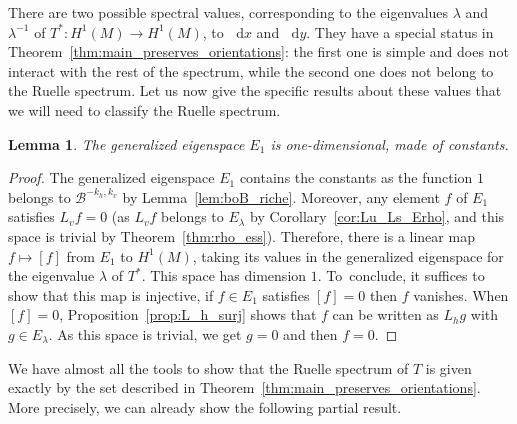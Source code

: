 \documentclass[JEP,XML,SOM,Unicode]{cedram}
\newcommand{\boB}{\mathcal{B}}
\newcommand{\dd}{\mathop{}\!\mathrm{d}}
\newtheorem{lem}[thm]{Lemma}
\theoremstyle{definition}
\numberwithin{equation}{section}
\begin{document}
There are two possible spectral values, corresponding to the eigenvalues
$\lambda$ and~$\lambda^{-1}$ of $T^*: H^1(M) \to H^1(M)$, \ie to $\dd x$
and $\dd y$. They have a special status in
Theorem~\ref{thm:main_preserves_orientations}: the first one is simple and
does not interact with the rest of the spectrum, while the second one does
not belong to the Ruelle spectrum. Let us now give the specific results about
these values that we will need to classify the Ruelle spectrum.

\begin{lem}
\label{lem:E1} The generalized eigenspace $E_1$ is one-dimensional, made of
constants.
\end{lem}
\begin{proof}
The generalized eigenspace $E_1$ contains the constants as the function $1$
belongs to $\boB^{-k_h, k_v}$ by Lemma~\ref{lem:boB_riche}. Moreover, any
element $f$ of $E_1$ satisfies $L_v f = 0$ (as $L_v f$ belongs to
$E_{\lambda}$ by Corollary~\ref{cor:Lu_Ls_Erho}, and this space is trivial
by Theorem~\ref{thm:rho_ess}). Therefore, there is a linear map $f \mapsto
[f]$ from $E_1$ to $H^1(M)$, taking its values in the generalized eigenspace
for the eigenvalue $\lambda$ of $T^*$. This space has dimension $1$. To~conclude, it suffices to show that this map is injective, \ie if $f\in E_1$
satisfies $[f] = 0$ then $f$ vanishes. When $[f] = 0$,
Proposition~\ref{prop:L_h_surj} shows that $f$ can be written as $L_h g$ with
$g \in E_{\lambda}$. As this space is trivial, we get $g=0$ and then $f=0$.
\end{proof}

We have almost all the tools to show that the Ruelle spectrum of $T$ is given
exactly by the set described in
Theorem~\ref{thm:main_preserves_orientations}. More precisely, we can already
show the following partial result.
\end{document}
